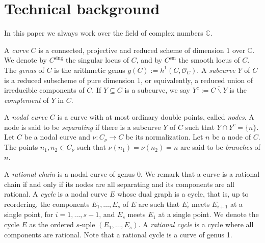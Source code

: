 \documentclass{article}
\newcommand{\Cbb}{\mathbb C}
\newcommand{\Ocal}{\mathcal O}
\renewcommand{\:}{\colon }
\begin{document}
\section{Technical background}\label{sec:back}


In this paper we always work over the field of complex numbers $\mathbb{C}$.





A \textit{curve} $C$ is a connected, projective and reduced scheme of dimension $1$ over $\Cbb$. 
We denote by $C^{\text{sing}}$ the singular locus of $C$, and by $C^{\text{sm}}$ the smooth locus of $C$.
The \emph{genus} of $C$ is the arithmetic genus $g(C):=h^1(C,\Ocal_C)$.
A \textit{subcurve} $Y $ of $C$ is a reduced subscheme of pure dimension $1$, or equivalently, a reduced union of irreducible components of $C$. 
If $Y\subseteq C$ is a subcurve, we say $Y^{c}:=\overline{C\smallsetminus Y}$ is the \emph{complement} of $Y$ in $C$. 


A \textit{nodal curve} $C$ is a curve with at most ordinary double points, called \emph{nodes}. 
A node is said to be \emph{separating} if there is a subcurve $Y$ of $C$ such that $Y\cap Y^c=\{n\}$. 
Let $C$ be a nodal curve and $\nu:{C}_\nu \rightarrow C$ be its normalization. Let 
$n$ be a node of $C$. The points $n_1, n_2 \in {C}_\nu$ such that $\nu(n_1)=\nu(n_2)=n$ are said  to be \textit{branches} of $n$.



A \emph{rational chain}  is a nodal curve of genus 0. 
We remark that a curve  is a rational chain if and only if its nodes are all separating and its components are all rational.
A \textit{cycle} is a  nodal curve $E$ whose dual graph is a cycle, that is, up to reordering, the components $E_1, \ldots, E_s$ of $E$ are such that $E_i$ meets $E_{i+1}$ at a single point, for $i=1,\ldots, s-1$, and $E_s$ meets $E_1$ at a single point. We  denote the cycle $E$ as the ordered $s$-uple $(E_1,\ldots,E_s)$. 
A \textit{rational cycle} is a cycle where all components are rational. Note that a rational cycle is a curve of genus 1.
\end{document}
